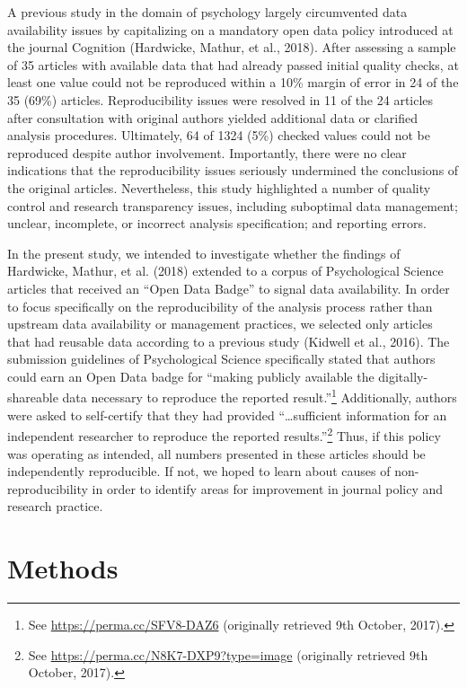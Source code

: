 \documentclass[english,,man,floatsintext]{apa6}
\begin{document}
A previous study in the domain of psychology largely circumvented data availability issues by capitalizing on a mandatory open data policy introduced at the journal Cognition (Hardwicke, Mathur, et al., 2018). After assessing a sample of 35 articles with available data that had already passed initial quality checks, at least one value could not be reproduced within a 10\% margin of error in 24 of the 35 (69\%) articles. Reproducibility issues were resolved in 11 of the 24 articles after consultation with original authors yielded additional data or clarified analysis procedures. Ultimately, 64 of 1324 (5\%) checked values could not be reproduced despite author involvement. Importantly, there were no clear indications that the reproducibility issues seriously undermined the conclusions of the original articles. Nevertheless, this study highlighted a number of quality control and research transparency issues, including suboptimal data management; unclear, incomplete, or incorrect analysis specification; and reporting errors.

In the present study, we intended to investigate whether the findings of Hardwicke, Mathur, et al. (2018) extended to a corpus of Psychological Science articles that received an \enquote{Open Data Badge} to signal data availability. In order to focus specifically on the reproducibility of the analysis process rather than upstream data availability or management practices, we selected only articles that had reusable data according to a previous study (Kidwell et al., 2016). The submission guidelines of Psychological Science specifically stated that authors could earn an Open Data badge for \enquote{making publicly available the digitally-shareable data necessary to reproduce the reported result.}\footnote{See \url{https://perma.cc/SFV8-DAZ6} (originally retrieved 9th October, 2017).} Additionally, authors were asked to self-certify that they had provided \enquote{\ldots{}sufficient information for an independent researcher to reproduce the reported results.}\footnote{See \url{https://perma.cc/N8K7-DXP9?type=image} (originally retrieved 9th October, 2017).} Thus, if this policy was operating as intended, all numbers presented in these articles should be independently reproducible. If not, we hoped to learn about causes of non-reproducibility in order to identify areas for improvement in journal policy and research practice.

\hypertarget{methods}{%
\section{Methods}\label{methods}}
\end{document}
